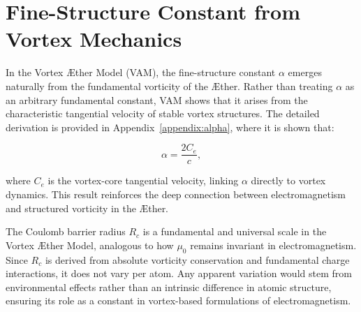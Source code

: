 

\section{Fine-Structure Constant from Vortex Mechanics}

In the Vortex Æther Model (VAM), the fine-structure constant $\alpha$ emerges naturally from the fundamental vorticity of the Æther. Rather
than treating $\alpha$ as an arbitrary fundamental constant, VAM shows that it arises from the characteristic tangential velocity of stable vortex
structures. The detailed derivation is provided in Appendix~\ref{appendix:alpha}, where it is shown that:

\begin{equation}
    \alpha = \frac{2 C_e}{c},
\end{equation}

where $C_e$ is the vortex-core tangential velocity, linking $\alpha$ directly to vortex dynamics. This result reinforces the deep connection between electromagnetism and structured vorticity in the Æther.


The Coulomb barrier radius \(R_c\) is a fundamental and universal scale in the Vortex Æther Model, analogous to how \(\mu_0\) remains invariant in electromagnetism. Since \(R_c\) is derived from absolute vorticity conservation and fundamental charge interactions, it does not vary per atom. Any apparent variation would stem from environmental effects rather than an intrinsic difference in atomic structure, ensuring its role as a constant in vortex-based formulations of electromagnetism.